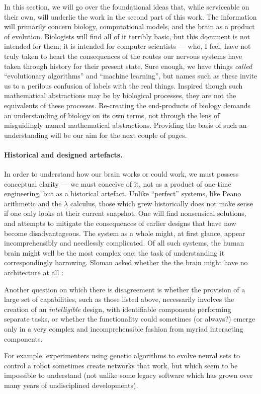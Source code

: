 In this section, we will go over the foundational ideas that, while serviceable on their own, will underlie the work in the second part of this work. The information will primarily concern biology, computational models, and the brain as a product of evolution. Biologists will find all of it terribly basic, but this document is not intended for them; it is intended for computer scientists --- who, I feel, have not truly taken to heart the consequences of the routes our nervous systems have taken through history for their present state. Sure enough, we have things {\em called} ``evolutionary algorithms'' and ``machine learning'', but names such as these invite us to a perilous confusion of labels with the real things. Inspired though such mathematical abstractions may be by biological processes, they are not the equivalents of these processes. Re-creating the end-products of biology demands an understanding of biology on its own terms, not through the lens of misguidingly named mathematical abstractions. Providing the basis of such an understanding will be our aim for the next couple of pages.

\paragraph{Historical and designed artefacts.} In order to understand how our brain works or could work, we must possess conceptual clarity --- we must conceive of it, not as a product of one-time engineering, but as a historical artefact. Unlike ``perfect'' systems, like Peano arithmetic and the $\lambda$ calculus, those which grew historically does not make sense if one only looks at their current snapshot. One will find nonsensical solutions, and attempts to mitigate the consequences of earlier designs that have now become disadvantageous. The system as a whole might, at first glance, appear incomprehensibly and needlessly complicated. Of all such systems, the human brain might well be the most complex one; the task of understanding it correspondingly harrowing. Sloman asked whether the the brain might have no architecture at all  \cite[p. 5]{sloman1997}:

\begin{emquote}
	Another question on which there is disagreement is whether the provision of a large set of capabilities, such as those listed above, necessarily involves the creation of an {\em intelligible} design, with identifiable components performing separate tasks, or whether the functionality could sometimes (or always?) emerge only in a very complex and incomprehensible fashion from myriad interacting components.
	
	For example, experimenters using genetic algorithms to evolve neural sets to control a robot sometimes create networks that work, but which seem to be impossible to understand (not unlike some legacy software which has grown over many years of undisciplined developments).
\end{emquote}

